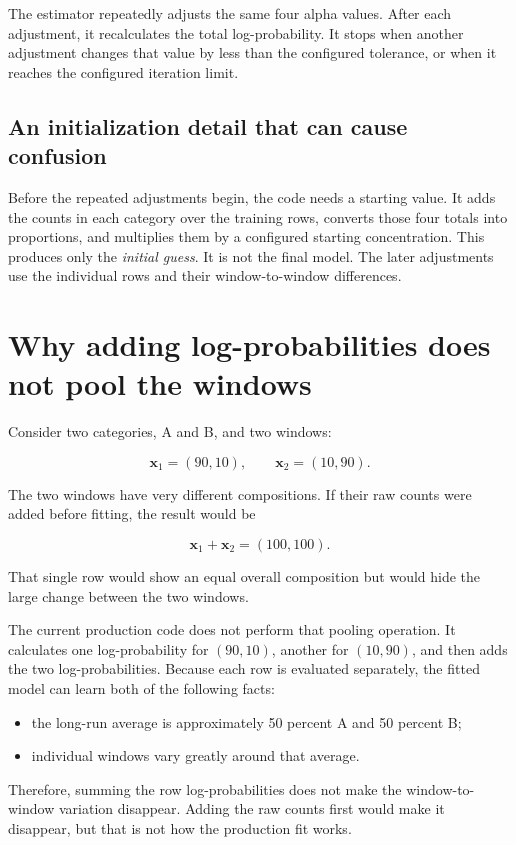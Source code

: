 \documentclass[11pt,a4paper]{article}
\begin{document}
The estimator repeatedly adjusts the same four alpha values.  After each
adjustment, it recalculates the total log-probability.  It stops when another
adjustment changes that value by less than the configured tolerance, or when it
reaches the configured iteration limit.

\subsection{An initialization detail that can cause confusion}

Before the repeated adjustments begin, the code needs a starting value.  It
adds the counts in each category over the training rows, converts those four
totals into proportions, and multiplies them by a configured starting
concentration.  This produces only the \emph{initial guess}.  It is not the
final model.  The later adjustments use the individual rows and their
window-to-window differences.

\section{Why adding log-probabilities does not pool the windows}

Consider two categories, A and B, and two windows:

\[
\mathbf{x}_1=(90,10),
\qquad
\mathbf{x}_2=(10,90).
\]

The two windows have very different compositions.  If their raw counts were
added before fitting, the result would be

\[
\mathbf{x}_1+\mathbf{x}_2=(100,100).
\]

That single row would show an equal overall composition but would hide the
large change between the two windows.

The current production code does not perform that pooling operation.  It
calculates one log-probability for $(90,10)$, another for $(10,90)$, and then
adds the two log-probabilities.  Because each row is evaluated separately, the
fitted model can learn both of the following facts:

\begin{itemize}
  \item the long-run average is approximately 50 percent A and 50 percent B;
  \item individual windows vary greatly around that average.
\end{itemize}

Therefore, summing the row log-probabilities does not make the
window-to-window variation disappear.  Adding the raw counts first would make
it disappear, but that is not how the production fit works.
\end{document}
